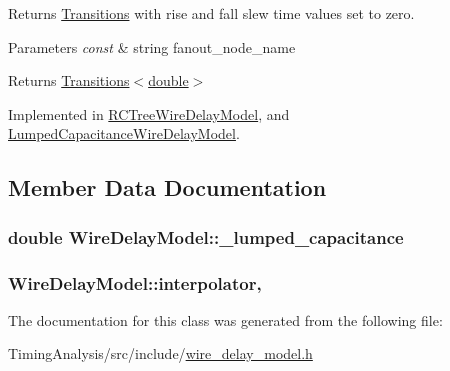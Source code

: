 Returns \hyperlink{classTransitions}{Transitions} with rise and fall slew time values set to zero. 


\begin{DoxyParams}{Parameters}
{\em const} & string fanout\-\_\-node\-\_\-name\\
\hline
\end{DoxyParams}
\begin{DoxyReturn}{Returns}
\hyperlink{classTransitions}{Transitions$<$double$>$} 
\end{DoxyReturn}


Implemented in \hyperlink{classRCTreeWireDelayModel_aea4c7315bdd3715ca0c67707b2c32a8c}{R\-C\-Tree\-Wire\-Delay\-Model}, and \hyperlink{classLumpedCapacitanceWireDelayModel_aaedd69e811e7220e48493c51fb0443ed}{Lumped\-Capacitance\-Wire\-Delay\-Model}.



\subsection{Member Data Documentation}
\hypertarget{classWireDelayModel_ab03b1640710e81c9dcd4cbe9b7fed329}{
\subsubsection[{\-\_\-lumped\-\_\-capacitance}]{\setlength{\rightskip}{0pt plus 5cm}double Wire\-Delay\-Model\-::\-\_\-lumped\-\_\-capacitance\hspace{0.3cm}{\ttfamily [protected]}}}\label{classWireDelayModel_ab03b1640710e81c9dcd4cbe9b7fed329}
\hypertarget{classWireDelayModel_aa8f767316492b902c13ec68651b30247}{
\subsubsection[{interpolator}]{ Wire\-Delay\-Model\-::interpolator\hspace{0.3cm}{\ttfamily [static]}, {\ttfamily [protected]}}}\label{classWireDelayModel_aa8f767316492b902c13ec68651b30247}


The documentation for this class was generated from the following file\-:\begin{DoxyCompactItemize}
\item 
Timing\-Analysis/src/include/\hyperlink{wire__delay__model_8h}{wire\-\_\-delay\-\_\-model.\-h}\end{DoxyCompactItemize}
